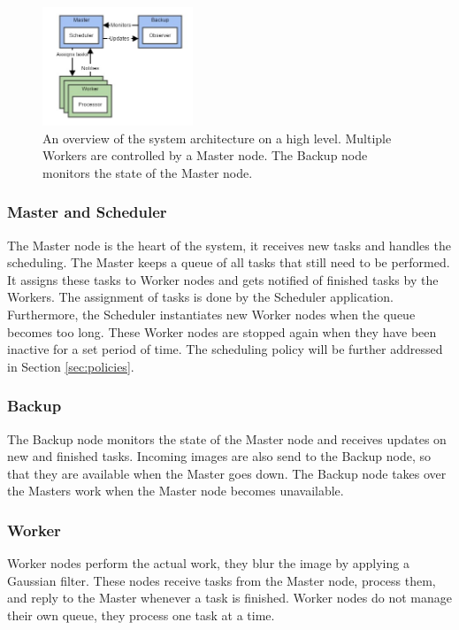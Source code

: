 \documentclass{acm_proc_article-sp}
\begin{document}
\begin{figure}[]
	\centering
	\includegraphics[width=0.4\textwidth]{images/architecture_overview.jpg}
	\caption{An overview of the system architecture on a high level. Multiple Workers are controlled by a Master node. The Backup node monitors the state of the Master node.}
	\label{fig:architecture_overview}
\end{figure}

\subsubsection{Master and Scheduler}
The Master node is the heart of the system, it receives new tasks and handles the scheduling.
The Master keeps a queue of all tasks that still need to be performed.
It assigns these tasks to Worker nodes and gets notified of finished tasks by the Workers.
The assignment of tasks is done by the Scheduler application.
Furthermore, the Scheduler instantiates new Worker nodes when the queue becomes too long.
These Worker nodes are stopped again when they have been inactive for a set period of time.
The scheduling policy will be further addressed in Section \ref{sec:policies}.

\subsubsection{Backup}
The Backup node monitors the state of the Master node and receives updates on new and finished tasks.
Incoming images are also send to the Backup node, so that they are available when the Master goes down.
The Backup node takes over the Masters work when the Master node becomes unavailable.

\subsubsection{Worker}
Worker nodes perform the actual work, they blur the image by applying a Gaussian filter.
These nodes receive tasks from the Master node, process them, and reply to the Master whenever a task is finished.
Worker nodes do not manage their own queue, they process one task at a time.
\end{document}
